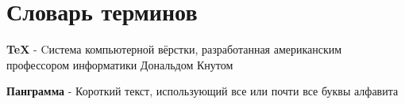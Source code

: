 \chapter*{Словарь терминов}             %

\textbf{TeX} - Cистема компьютерной вёрстки, разработанная американским профессором информатики Дональдом Кнутом

\textbf{Панграмма} - Короткий текст, использующий все или почти все буквы алфавита
